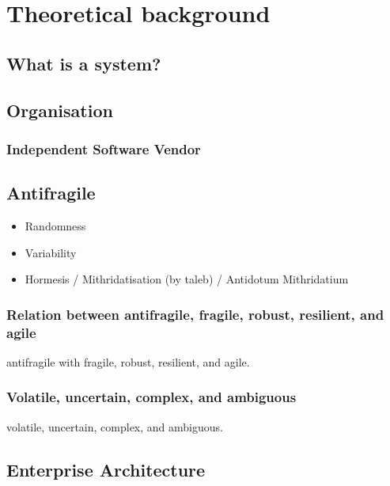 \chapter{Theoretical background}
\label{ch:theoreticalbackground}

\section{What is a system?}
\label{sec:tbsystem}

\section{Organisation}
\label{sec:tborganisation}

\subsection{Independent Software Vendor}
\label{sub:tbisv}

\section{Antifragile}
\label{sec:tbantifragile}

\begin{itemize}
	\item{Randomness}
	\item{Variability}
	\item{Hormesis / Mithridatisation (by taleb) / Antidotum Mithridatium}
\end{itemize}

\subsection{Relation between antifragile, fragile, robust, resilient, and agile}
\label{sub:tbrelatedtoantifragile}

\gls{antifragile} with \gls{fragile}, \gls{robust}, \gls{resilient}, and \gls{agile}.

\subsection{Volatile, uncertain, complex, and ambiguous}
\label{seb:tbvuca}

\Gls{volatile}, \gls{uncertain}, \gls{complex}, and \gls{ambiguous}.

\section{Enterprise Architecture}
\label{sec:tbea}

